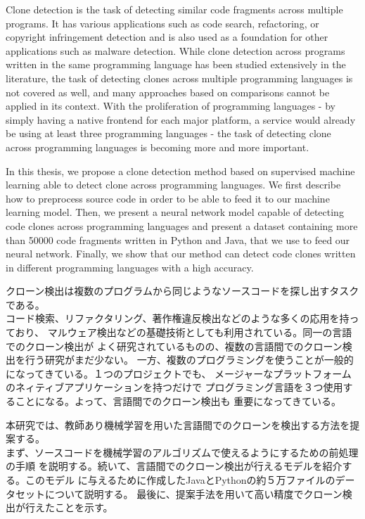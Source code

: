 \begin{eabstract}
Clone detection is the task of detecting similar code fragments across
multiple programs. It has various applications such as code search,
refactoring, or copyright infringement detection and is also used as a
foundation for other applications such as malware detection. While clone
detection across programs written in the same programming language has been
studied extensively in the literature, the task of detecting clones across
multiple programming languages is not covered as well, and many approaches
based on comparisons cannot be applied in its context. With the proliferation
of programming languages - by simply having a native frontend for each major
platform, a service would already be using at least three programming
languages - the task of detecting clone across programming languages is
becoming more and more important.

In this thesis, we propose a clone detection method based on supervised
machine learning able to detect clone across programming languages. We first
describe how to preprocess source code in order to be able to feed it to our
machine learning model. Then, we present a neural network model capable of
detecting code clones across programming languages and present a dataset
containing more than 50000 code fragments written in Python and Java,
that we use to feed our neural network. Finally, we show that our method can
detect code clones written in different programming languages with a high accuracy.
\end{eabstract}

\begin{jabstract}
クローン検出は複数のプログラムから同じようなソースコードを探し出すタスクである。\\
コード検索、リファクタリング、著作権違反検出などのような多くの応用を持っており、%
マルウェア検出などの基礎技術としても利用されている。同一の言語でのクローン検出が%
よく研究されているものの、複数の言語間でのクローン検出を行う研究がまだ少ない。%
一方、複数のプログラミングを使うことが一般的になってきている。１つのプロジェクトでも、%
メージャーなプラットフォームのネィティブアプリケーションを持つだけで%
プログラミング言語を３つ使用することになる。よって、言語間でのクローン検出も%
重要になってきている。

本研究では、教師あり機械学習を用いた言語間でのクローンを検出する方法を提案する。\\
まず、ソースコードを機械学習のアルゴリズムで使えるようにするための前処理の手順%
を説明する。続いて、言語間でのクローン検出が行えるモデルを紹介する。このモデル%
に与えるために作成したJavaとPythonの約５万ファイルのデータセットについて説明する。%
最後に、提案手法を用いて高い精度でクローン検出が行えたことを示す。
\end{jabstract}
